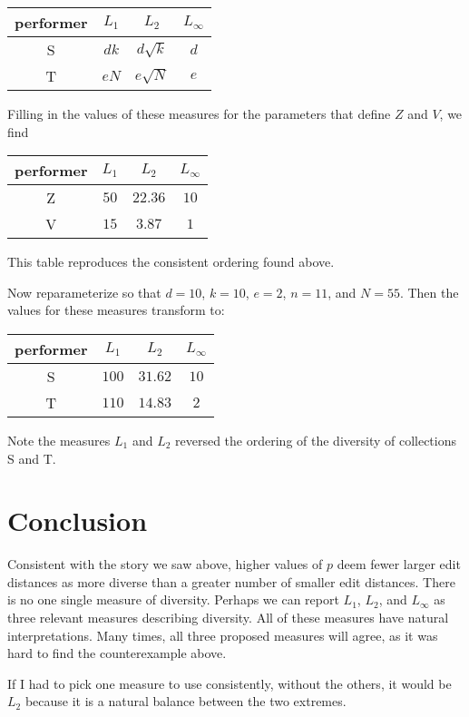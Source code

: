 \documentclass{article}
\begin{document}
\begin{tabular}{c|ccc}
  performer & $L_1$ & $L_2$ & $L_\infty$ \\
\hline
  S & $dk$ & $d \sqrt{k}$ & $d$ \\
  T & $eN$ & $e \sqrt{N}$ & $e$
\end{tabular}

Filling in the values of these measures for the parameters that define
$Z$ and $V$, we find

\begin{tabular}{c|ccc}
  performer & $L_1$ & $L_2$ & $L_\infty$ \\
\hline
  Z & $50$ & $22.36$ & $10$ \\
  V & $15$ & $3.87$ & $1$
\end{tabular}

This table reproduces the consistent ordering found above.

Now reparameterize so that $d = 10$, $k = 10$, $e = 2$, $n = 11$, and
$N = 55$. Then the values for these measures transform to:

\begin{tabular}{c|ccc}
  performer & $L_1$ & $L_2$ & $L_\infty$ \\
  \hline
  S & $100$ & $31.62$ & $10$ \\
  T & $110$ & $14.83$ & $2$
\end{tabular}

Note the measures $L_1$ and $L_2$ reversed the ordering of the
diversity of collections S and T.

\section{Conclusion}
Consistent with the story we saw above, higher values of $p$ deem
fewer larger edit distances as more diverse than a greater number of
smaller edit distances.  There is no one single measure of diversity.
Perhaps we can report $L_1$, $L_2$, and $L_\infty$ as three relevant
measures describing diversity.  All of these measures have natural
interpretations.  Many times, all three proposed measures will agree,
as it was hard to find the counterexample above.

If I had to pick one measure to use consistently, without the others,
it would be $L_2$ because it is a natural balance between the two
extremes.
\end{document}
